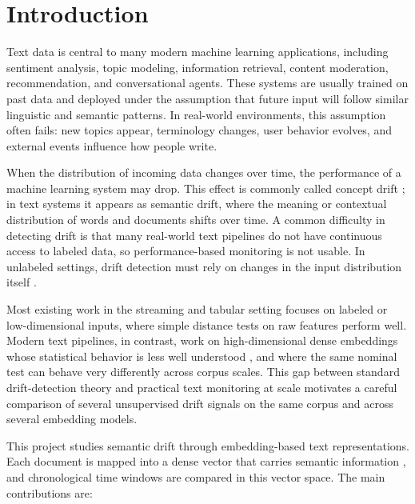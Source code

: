\documentclass[conference]{IEEEtran}
\begin{document}
\section{Introduction}
\label{sec:introduction}

Text data is central to many modern machine learning applications, including sentiment analysis, topic modeling, information retrieval, content moderation, recommendation, and conversational agents. These systems are usually trained on past data and deployed under the assumption that future input will follow similar linguistic and semantic patterns. In real-world environments, this assumption often fails: new topics appear, terminology changes, user behavior evolves, and external events influence how people write.

When the distribution of incoming data changes over time, the performance of a machine learning system may drop. This effect is commonly called concept drift \cite{gama2014,lu2018}; in text systems it appears as semantic drift, where the meaning or contextual distribution of words and documents shifts over time. A common difficulty in detecting drift is that many real-world text pipelines do not have continuous access to labeled data, so performance-based monitoring is not usable. In unlabeled settings, drift detection must rely on changes in the input distribution itself \cite{abghani2020,demello2019}.

Most existing work in the streaming and tabular setting focuses on labeled or low-dimensional inputs, where simple distance tests on raw features perform well. Modern text pipelines, in contrast, work on high-dimensional dense embeddings whose statistical behavior is less well understood \cite{rabanser2019}, and where the same nominal test can behave very differently across corpus scales. This gap between standard drift-detection theory and practical text monitoring at scale motivates a careful comparison of several unsupervised drift signals on the same corpus and across several embedding models.

This project studies semantic drift through embedding-based text representations. Each document is mapped into a dense vector that carries semantic information \cite{mikolov2013,le2014,reimers2019}, and chronological time windows are compared in this vector space. The main contributions are:
\end{document}

